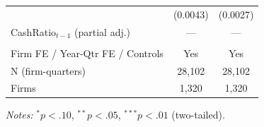 \begin{table}[htbp]
\begin{tabular}{lcc}
 & (0.0043) & (0.0027) \\
CashRatio$_{t-1}$ (partial adj.) & --- & --- \\
 &  &  \\
\midrule
Firm FE / Year-Qtr FE / Controls & Yes & Yes \\
N (firm-quarters) & 28,102 & 28,102 \\
Firms & 1,320 & 1,320 \\
\bottomrule
\end{tabular}
\begin{minipage}{\linewidth}\vspace{2pt}\scriptsize
\textit{Notes:} $^{*}p<.10$, $^{**}p<.05$, $^{***}p<.01$ (two-tailed).
\end{minipage}
\end{table}